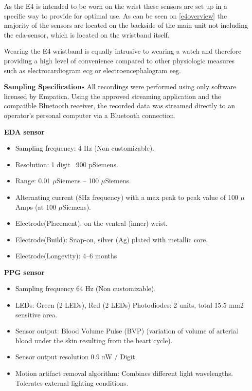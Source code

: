 As the E4 is intended to be worn on the wrist these sensors are set up in a specific way to provide for optimal use. As can be seen on \ref{e4overview} the majority of the sensors are located on the backside of the main unit not including the \gls{eda}-sensor, which is located on the wristband itself. 

Wearing the E4 wristband is equally intrusive to wearing a watch and therefore providing a high level of convenience compared to other physiologic measures such as electrocardiogram \gls{ecg} or electroencephalogram \gls{eeg}.

\textbf{Sampling Specifications}
All recordings were performed using only software licensed by Empatica. Using the approved streaming application and the compatible Bluetooth receiver, the recorded data was streamed directly to an operator's personal computer via a Bluetooth connection. 

\textbf{EDA sensor}
\begin{itemize}
\item Sampling frequency: 4 Hz (Non customizable).
\item Resolution: 1 digit ~900 pSiemens.
\item Range: 0.01 $\mu$Siemens – 100 $\mu$Siemens.
\item Alternating current (8Hz frequency) with a
max peak to peak value of 100 $\mu$Amps (at 100
$\mu$Siemens).
\item Electrode(Placement): on the ventral (inner) wrist.
\item Electrode(Build): Snap-on, silver (Ag) plated with metallic core.
\item Electrode(Longevity): 4–6 months
\end{itemize}

\textbf{PPG sensor}
\begin{itemize}
\item Sampling frequency 64 Hz (Non customizable).
\item LEDs: Green (2 LEDs), Red (2 LEDs) Photodiodes: 2
units, total 15.5 mm2 sensitive area.
\item Sensor output: Blood Volume Pulse (BVP) (variation
of volume of arterial blood under the skin resulting
from the heart cycle).
\item Sensor output resolution 0.9 nW / Digit.
\item Motion artifact removal algorithm: Combines different light wavelengths. Tolerates external lighting conditions.
\end{itemize}

